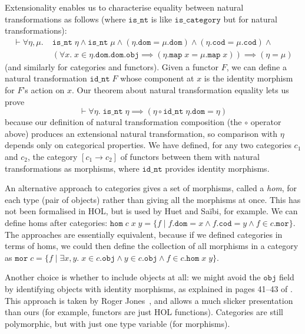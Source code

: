 \documentclass[twoside,titlepage,11pt]{article}
\begin{document}
Extensionality enables us to characterise equality between natural transformations as follows (where $\mathtt{is\_nt}$ is like $\mathtt{is\_category}$ but for natural transformations):
\begin{align*}
\vdash\forall{\eta,\mu}.\;&\mathtt{is\_nt}\;\eta\land\mathtt{is\_nt}\;\mu\land(\eta.\mathtt{dom} = \mu.\mathtt{dom})\land(\eta.\mathtt{cod} = \mu.\mathtt{cod})\land{}\\
&(\forall{x}.\;x\in \eta.\mathtt{dom}.\mathtt{dom}.\mathtt{obj}\implies(\eta.\mathtt{map}\;x= \mu.\mathtt{map}\;x))\implies (\eta = \mu)
\end{align*}
(and similarly for categories and functors).
Given a functor $F$, we can define a natural transformation $\mathtt{id\_nt}\;F$ whose component at $x$ is the identity morphism for $F$'s action on $x$.
Our theorem about natural transformation equality lets us prove
\[\vdash\forall{\eta}.\;\mathtt{is\_nt}\;\eta\implies(\eta\circ\mathtt{id\_nt}\;\eta.\mathtt{dom} = \eta)\]
because our definition of natural transformation composition (the $\circ$ operator above) produces an extensional natural transformation, so comparison with $\eta$ depends only on categorical properties.
We have defined, for any two categories $c_1$ and $c_2$, the category $[c_1\to c_2]$ of functors between them with natural transformations as morphisms, where $\mathtt{id\_nt}$ provides identity morphisms.

An alternative approach to categories gives a set of morphisms, called a \emph{hom}, for each type (pair of objects) rather than giving all the morphisms at once.
This has not been formalised in HOL, but is used by Huet and Sa{\"i}bi, for example.
We can define homs after categories: $\mathtt{hom}\;c\;x\;y=\{f\mid f.\mathtt{dom}=x\land f.\mathtt{cod}=y\land f\in c.\mathtt{mor}\}$.
The approaches are essentially equivalent, because if we defined categories in terms of homs, we could then define the collection of all morphisms in a category as $\mathtt{mor}\;c=\{f\mid\exists{x,y}.\;x\in c.\mathtt{obj}\land y\in c.\mathtt{obj}\land f\in c.\mathtt{hom}\;x\;y\}$.

Another choice is whether to include objects at all: we might avoid the $\mathtt{obj}$ field by identifying objects with identity morphisms, as explained in pages 41--43 of \cite{DBLP:books/daglib/0023249}.
This approach is taken by Roger Jones~\cite{RBJones17}, and allows a much slicker presentation than ours (for example, functors are just HOL functions).
Categories are still polymorphic, but with just one type variable (for morphisms).
\end{document}
